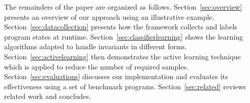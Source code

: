 
The remainders of the paper are organized as follows.
Section~\ref{sec:overview} presents an overview of our approach using an illustrative example.
Section~\ref{sec:datacollection} presents how the framework collects and labels program states at runtime.
Section~\ref{sec:classifierlearning} shows the learning algorithms adapted to handle invariants in different forms.
Section~\ref{sec:activelearning} then demonstrates the active learning technique which is applied to reduce the number of required samples.
Section~\ref{sec:evaluations} discusses our implementation and evaluates its effectiveness using a set of benchmark programs.
Section~\ref{sec:related} reviews related work and concludes.

